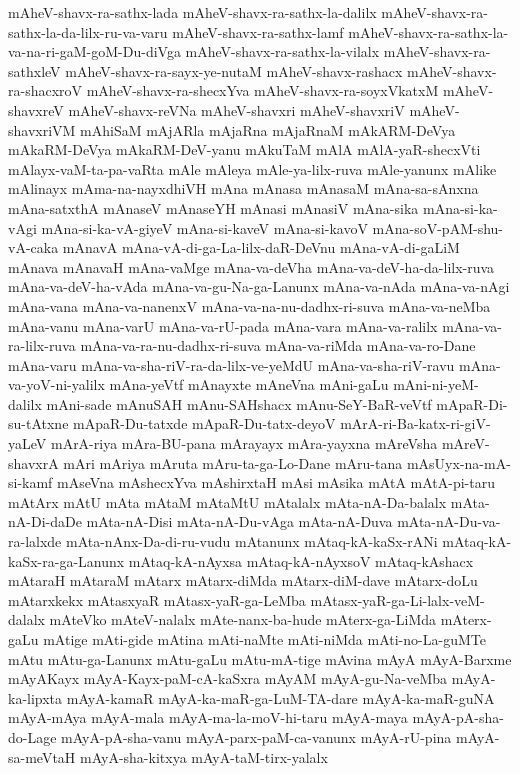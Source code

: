 {mAheV-shavx-ra-sathx-lada
mAheV-shavx-ra-sathx-la-dalilx
mAheV-shavx-ra-sathx-la-da-lilx-ru-va-varu
mAheV-shavx-ra-sathx-lamf
mAheV-shavx-ra-sathx-la-va-na-ri-gaM-goM-Du-diVga
mAheV-shavx-ra-sathx-la-vilalx
mAheV-shavx-ra-sathxleV
mAheV-shavx-ra-sayx-ye-nutaM
mAheV-shavx-rashacx
mAheV-shavx-ra-shacxroV
mAheV-shavx-ra-shecxYva
mAheV-shavx-ra-soyxVkatxM
mAheV-shavxreV
mAheV-shavx-reVNa
mAheV-shavxri
mAheV-shavxriV
mAheV-shavxriVM
mAhiSaM
mAjARla
mAjaRna
mAjaRnaM
mAkARM-DeVya
mAkaRM-DeVya
mAkaRM-DeV-yanu
mAkuTaM
mAlA
mAlA-yaR-shecxVti
mAlayx-vaM-ta-pa-vaRta
mAle
mAleya
mAle-ya-lilx-ruva
mAle-yanunx
mAlike
mAlinayx
mAma-na-nayxdhiVH
mAna
mAnasa
mAnasaM
mAna-sa-sAnxna
mAna-satxthA
mAnaseV
mAnaseYH
mAnasi
mAnasiV
mAna-sika
mAna-si-ka-vAgi
mAna-si-ka-vA-giyeV
mAna-si-kaveV
mAna-si-kavoV
mAna-soV-pAM-shu-vA-caka
mAnavA
mAna-vA-di-ga-La-lilx-daR-DeVnu
mAna-vA-di-gaLiM
mAnava
mAnavaH
mAna-vaMge
mAna-va-deVha
mAna-va-deV-ha-da-lilx-ruva
mAna-va-deV-ha-vAda
mAna-va-gu-Na-ga-Lanunx
mAna-va-nAda
mAna-va-nAgi
mAna-vana
mAna-va-nanenxV
mAna-va-na-nu-dadhx-ri-suva
mAna-va-neMba
mAna-vanu
mAna-varU
mAna-va-rU-pada
mAna-vara
mAna-va-ralilx
mAna-va-ra-lilx-ruva
mAna-va-ra-nu-dadhx-ri-suva
mAna-va-riMda
mAna-va-ro-Dane
mAna-varu
mAna-va-sha-riV-ra-da-lilx-ve-yeMdU
mAna-va-sha-riV-ravu
mAna-va-yoV-ni-yalilx
mAna-yeVtf
mAnayxte
mAneVna
mAni-gaLu
mAni-ni-yeM-dalilx
mAni-sade
mAnuSAH
mAnu-SAHshacx
mAnu-SeY-BaR-veVtf
mApaR-Di-su-tAtxne
mApaR-Du-tatxde
mApaR-Du-tatx-deyoV
mArA-ri-Ba-katx-ri-giV-yaLeV
mArA-riya
mAra-BU-pana
mArayayx
mAra-yayxna
mAreVsha
mAreV-shavxrA
mAri
mAriya
mAruta
mAru-ta-ga-Lo-Dane
mAru-tana
mAsUyx-na-mA-si-kamf
mAseVna
mAshecxYva
mAshirxtaH
mAsi
mAsika
mAtA
mAtA-pi-taru
mAtArx
mAtU
mAta
mAtaM
mAtaMtU
mAtalalx
mAta-nA-Da-balalx
mAta-nA-Di-daDe
mAta-nA-Disi
mAta-nA-Du-vAga
mAta-nA-Duva
mAta-nA-Du-va-ra-lalxde
mAta-nAnx-Da-di-ru-vudu
mAtanunx
mAtaq-kA-kaSx-rANi
mAtaq-kA-kaSx-ra-ga-Lanunx
mAtaq-kA-nAyxsa
mAtaq-kA-nAyxsoV
mAtaq-kAshacx
mAtaraH
mAtaraM
mAtarx
mAtarx-diMda
mAtarx-diM-dave
mAtarx-doLu
mAtarxkekx
mAtasxyaR
mAtasx-yaR-ga-LeMba
mAtasx-yaR-ga-Li-lalx-veM-dalalx
mAteVko
mAteV-nalalx
mAte-nanx-ba-hude
mAterx-ga-LiMda
mAterx-gaLu
mAtige
mAti-gide
mAtina
mAti-naMte
mAti-niMda
mAti-no-La-guMTe
mAtu
mAtu-ga-Lanunx
mAtu-gaLu
mAtu-mA-tige
mAvina
mAyA
mAyA-Barxme
mAyAKayx
mAyA-Kayx-paM-cA-kaSxra
mAyAM
mAyA-gu-Na-veMba
mAyA-ka-lipxta
mAyA-kamaR
mAyA-ka-maR-ga-LuM-TA-dare
mAyA-ka-maR-guNA
mAyA-mAya
mAyA-mala
mAyA-ma-la-moV-hi-taru
mAyA-maya
mAyA-pA-sha-do-Lage
mAyA-pA-sha-vanu
mAyA-parx-paM-ca-vanunx
mAyA-rU-pina
mAyA-sa-meVtaH
mAyA-sha-kitxya
mAyA-taM-tirx-yalalx
}
